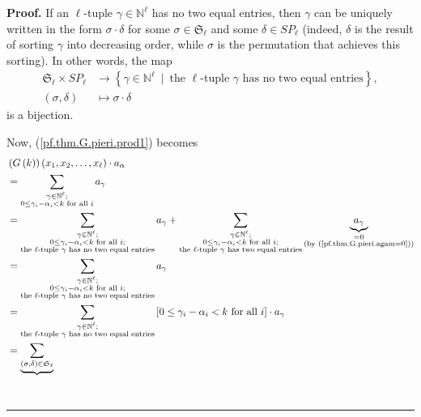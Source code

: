 \documentclass[numbers=enddot,12pt,final,onecolumn,notitlepage]{scrartcl}%
\theoremstyle{definition}
\newenvironment{proof}[1][Proof]{\noindent\textbf{#1.} }{\ \rule{0.5em}{0.5em}}
\let\sumnonlimits\sum
\renewcommand{\sum}{\sumnonlimits\limits}
\newenvironment{verlong}{}{}
\begin{document}
\begin{verlong}
\begin{proof}
If an $\ell$-tuple $\gamma\in\mathbb{N}^{\ell}$ has no two equal entries, then
$\gamma$ can be uniquely written in the form $\sigma\cdot\delta$ for some
$\sigma\in\mathfrak{S}_{\ell}$ and some $\delta\in SP_{\ell}$ (indeed,
$\delta$ is the result of sorting $\gamma$ into decreasing order, while
$\sigma$ is the permutation that achieves this sorting). In other words, the
map%
\begin{align}
\mathfrak{S}_{\ell}\times SP_{\ell}  &  \rightarrow\left\{  \gamma
\in\mathbb{N}^{\ell}\ \mid\ \text{the }\ell\text{-tuple }\gamma\text{ has no
two equal entries}\right\}  ,\nonumber\\
\left(  \sigma,\delta\right)   &  \mapsto\sigma\cdot\delta
\label{pf.thm.G.pieri.SSPbbij}%
\end{align}
is a bijection.

Now, (\ref{pf.thm.G.pieri.prod1}) becomes%
\begin{align}
&  \left(  G\left(  k\right)  \right)  \left(  x_{1},x_{2},\ldots,x_{\ell
}\right)  \cdot a_{\alpha}\nonumber\\
&  =\sum_{\substack{\gamma\in\mathbb{N}^{\ell};\\0\leq\gamma_{i}-\alpha
_{i}<k\text{ for all }i}}a_{\gamma}\nonumber\\
&  =\sum_{\substack{\gamma\in\mathbb{N}^{\ell};\\0\leq\gamma_{i}-\alpha
_{i}<k\text{ for all }i;\\\text{the }\ell\text{-tuple }\gamma\text{ has no two
equal entries}}}a_{\gamma}+\sum_{\substack{\gamma\in\mathbb{N}^{\ell}%
;\\0\leq\gamma_{i}-\alpha_{i}<k\text{ for all }i;\\\text{the }\ell\text{-tuple
}\gamma\text{ has two equal entries}}}\underbrace{a_{\gamma}}%
_{\substack{=0\\\text{(by (\ref{pf.thm.G.pieri.agam=0}))}}}\nonumber\\
&  =\sum_{\substack{\gamma\in\mathbb{N}^{\ell};\\0\leq\gamma_{i}-\alpha
_{i}<k\text{ for all }i;\\\text{the }\ell\text{-tuple }\gamma\text{ has no two
equal entries}}}a_{\gamma}\nonumber\\
&  =\sum_{\substack{\gamma\in\mathbb{N}^{\ell};\\\text{the }\ell\text{-tuple
}\gamma\text{ has no two equal entries}}}\left[  0\leq\gamma_{i}-\alpha
_{i}<k\text{ for all }i\right]  \cdot a_{\gamma}\nonumber\\
&  =\underbrace{\sum_{\left(  \sigma,\delta\right)  \in\mathfrak{S}_{\ell
}}}
\end{align}
\end{proof}
\end{verlong}
\end{document}
